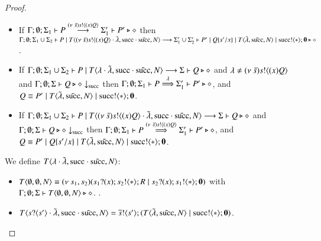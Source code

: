 \begin{proof}
\begin{itemize}
		\item	If $\Gamma; \emptyset; \Sigma_1 \vdash P \stackrel{(\nu\ \tilde{s})s ! \langle (x)Q \rangle}{\longrightarrow} \Sigma_1' \vdash P' \triangleright \diamond$
			then
			$\Gamma; \emptyset; \Sigma_1 \cup \Sigma_2 \vdash P \;|\; T\langle (\nu\ \tilde{s})s ! \langle (x)Q \rangle \cdot \tilde{\lambda}, \textrm{succ} \cdot \tilde{\textrm{succ}}, N \rangle \longrightarrow \Sigma_1' \cup \Sigma_2' \vdash P' \;|\; Q\{s'/x \} \;|\; T\langle \tilde{\lambda}, \tilde{\textrm{succ}}, N \rangle \;|\; \textrm{succ} ! \langle \ast \rangle ; \mathbf{0} \triangleright \diamond$.


		\item	If $\Gamma; \emptyset; \Sigma_1 \cup \Sigma_2 \vdash P \;|\; T\langle \lambda \cdot \tilde{\lambda}, \textrm{succ} \cdot \tilde{\textrm{succ}}, N \rangle \longrightarrow \Sigma \vdash Q \triangleright \diamond$
			and $\lambda\not=(\nu\ \tilde{s})s ! \langle (x)Q \rangle$
			and $\Gamma; \emptyset; \Sigma \vdash Q \triangleright \diamond \downarrow_{\textrm{succ}}$ then
			$\Gamma; \emptyset; \Sigma_1 \vdash P \stackrel{\lambda}{\Longrightarrow} \Sigma_1' \vdash P' \triangleright \diamond$,
			and $Q \equiv P' \;|\; T\langle \tilde{\lambda}, \tilde{\textrm{succ}}, N \rangle \;|\; \textrm{succ} ! \langle \ast \rangle ; \mathbf{0}$.

		\item	If $\Gamma; \emptyset; \Sigma_1 \cup \Sigma_2 \vdash P \;|\; T\langle (\nu\ \tilde{s})s ! \langle (x)Q \rangle \cdot \tilde{\lambda}, \textrm{succ} \cdot \tilde{\textrm{succ}}, N \rangle \longrightarrow \Sigma \vdash Q \triangleright \diamond$
			and $\Gamma; \emptyset; \Sigma \vdash Q \triangleright \diamond \downarrow_{\textrm{succ}}$ then
			$\Gamma; \emptyset; \Sigma_1 \vdash P \stackrel{(\nu\ \tilde{s})s ! \langle (x)Q \rangle}{\Longrightarrow} \Sigma_1' \vdash P' \triangleright \diamond$,
			and $Q \equiv P' \;|\; Q \{s'/x \} \;|\; T\langle \tilde{\lambda}, \tilde{\textrm{succ}}, N \rangle \;|\; \textrm{succ} ! \langle \ast \rangle ; \mathbf{0}$.


	\end{itemize}

	
	We define $T\langle \lambda \cdot \tilde{\lambda}, \textrm{succ} \cdot \tilde{\textrm{succ}}, N \rangle$:

	\begin{itemize}
		\item	$T\langle \emptyset, \emptyset, N \rangle \equiv (\nu\ s_1, s_2)(s_1 ? (x) ; s_2 ! \langle \ast \rangle ; R \;|\; s_2 ? (x) ; s_1 ! \langle \ast \rangle ; \mathbf{0})$ with
			$\Gamma; \emptyset; \Sigma \vdash T\langle \emptyset, \emptyset, N \rangle \triangleright \diamond$.
			.

		\item	$T\langle s ? \langle s' \rangle \cdot \tilde{\lambda}, \textrm{succ} \cdot \tilde{\textrm{succ}}, N \rangle = \overline{s} ! \langle s' \rangle ; (T\langle \tilde{\lambda}, \tilde{\textrm{succ}}, N \rangle \;|\; \textrm{succ} ! \langle \ast \rangle ; \mathbf{0})$.


\end{itemize}
\end{proof}
